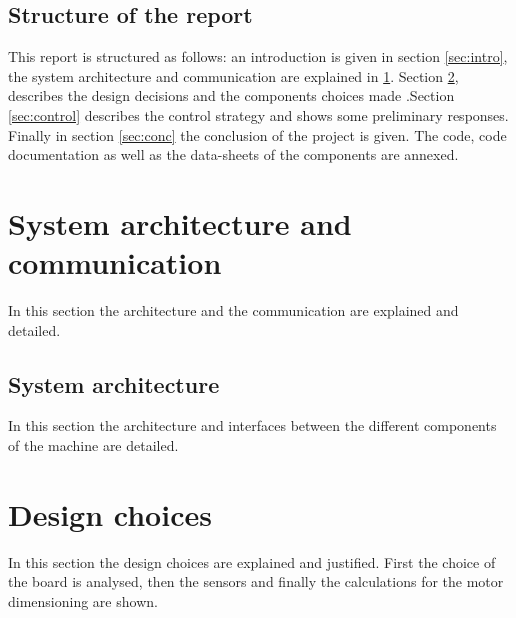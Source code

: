 \documentclass[12pt,a4paper]{article}
\begin{document}
\subsection{Structure of the report}
This report is structured as follows: an introduction is given in section \ref{sec:intro}, the system architecture and communication are explained in \ref{sec:archi}. Section \ref{sec:design}, describes the design decisions and the components choices made .Section \ref{sec:control} describes the control strategy and shows some preliminary responses.
Finally in section \ref{sec:conc} the conclusion of the project is given. The code, code documentation as well as the data-sheets of the components are annexed.

\section{System architecture and communication} \label{sec:archi}
In this section the architecture and the communication are explained and detailed.
\subsection{System architecture}
In this section the architecture and interfaces between the different components of the machine are detailed.

\section{Design choices}\label{sec:design}
In this section the design choices are explained and justified. First the choice of the board is analysed, then the sensors and finally the calculations for the motor dimensioning are shown.
\end{document}
